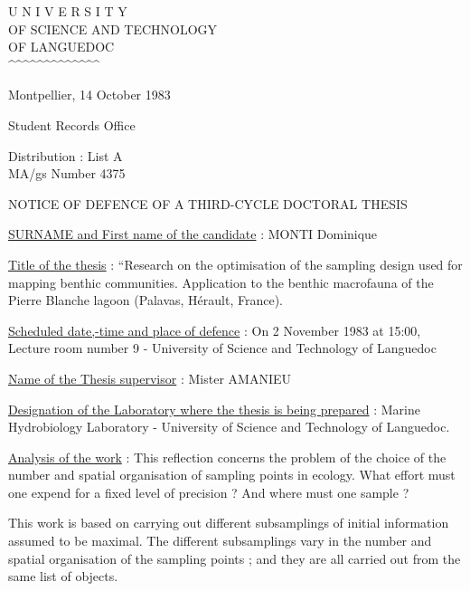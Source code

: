 
\begin{center}
U N I V E R S I T Y\\
OF SCIENCE AND TECHNOLOGY\\
OF LANGUEDOC\\
\textasciicircum\textasciicircum\textasciicircum\textasciicircum\textasciicircum\textasciicircum\textasciicircum\textasciicircum\textasciicircum\textasciicircum\textasciicircum\textasciicircum\textasciicircum
\end{center}

Montpellier, 14 October 1983

Student Records Office

Distribution : List A\\
MA/gs \hfill Number 4375

\begin{center}
NOTICE OF DEFENCE OF A THIRD-CYCLE DOCTORAL THESIS

\end{center}

\uline{SURNAME and First name of the candidate} : MONTI Dominique

\uline{Title of the thesis} : ``Research on the optimisation of the sampling design used for mapping benthic communities. Application to the benthic macrofauna of the Pierre Blanche lagoon (Palavas, Hérault, France).

\uline{Scheduled date,-time and place of defence} : On 2 November 1983 at 15:00,\\
Lecture room number 9 - University of Science and Technology of Languedoc

\uline{Name of the Thesis supervisor} : Mister AMANIEU

\uline{Designation of the Laboratory where the thesis is being prepared} : Marine Hydrobiology Laboratory - University of Science and Technology of Languedoc.

\uline{Analysis of the work} : This reflection concerns the problem of the choice of the number and spatial organisation of sampling points in ecology. What effort must one expend for a fixed level of precision ? And where must one sample ?

This work is based on carrying out different subsamplings of initial information assumed to be maximal. The different subsamplings vary in the number and spatial organisation of the sampling points ; and they are all carried out from the same list of objects.

